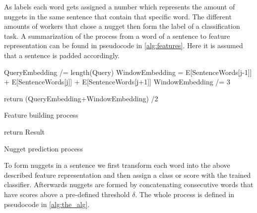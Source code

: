 \documentclass{article}
\begin{document}
As labels each word gets assigned a number which represents the amount of nuggets in the same sentence that contain that specific word. The different amounts of workers that chose a nugget then form the label of a classification task. A summarization of the process from a word of a sentence to feature representation can be found in pseudocode in  \ref{alg:features}. Here it is assumed that a sentence is padded accordingly.

\begin{algorithm}
	\label{alg:features}


	QueryEmbedding /= length(Query)\;
	WindowEmbedding = E[SentenceWords[j-1]] + E[SentenceWords[j]] + E[SentenceWords[j+1]]\;
	WindowEmbedding /= 3\;


	return (QueryEmbedding+WindowEmbedding) /2 \;

	\caption{Feature building process}
\end{algorithm}


\begin{algorithm}
	\label{alg:the_alg}
	return Result \;

	\caption{Nugget prediction process}
\end{algorithm}
To form nuggets in a sentence we first transform each word into the above described feature representation and then assign a class or score with the trained classifier. Afterwards nuggets are formed by concatenating consecutive words that have scores above a pre-defined threshold $\delta$. The whole process is defined in pseudocode in \ref{alg:the_alg}.
\end{document}
